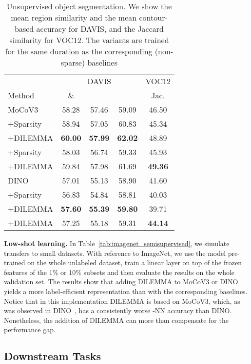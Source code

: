 \documentclass[letterpaper]{article} \usepackage{aaai23}  \usepackage{times}  \usepackage{helvet}  \usepackage{courier}  \usepackage[hyphens]{url}  \usepackage{graphicx} \urlstyle{rm} \def\UrlFont{\rm}  \usepackage{natbib}  \usepackage{caption} \frenchspacing  \setlength{\pdfpagewidth}{8.5in}  \setlength{\pdfpageheight}{11in}  \usepackage{algorithm}
\newcommand{\methodname}{DILEMMA}
\begin{document}
\begin{table}[t]
    \centering
    \small
    \begin{tabular*}{\linewidth}{@{}l@{\extracolsep{\fill}}cccc@{}}
    \toprule
    {} & \multicolumn{3}{c}{DAVIS} & VOC12 \\
    Method & \& &  &  & Jac.\\
    \midrule
    MoCoV3 & 58.28 & 57.46 & 59.09 & 46.50 \\
    +Sparsity & 58.94 & 57.05 & 60.83 & 45.34 \\
    +\methodname & \bf 60.00 & \bf 57.99 & \bf 62.02 & 48.89 \\
    +Sparsity & 58.03 & 56.74 & 59.33 & 45.93 \\
    +\methodname & 59.84 & 57.98 & 61.69 & \bf 49.36 \\
    \midrule
    DINO & 57.01 & 55.13 & 58.90 & 41.60 \\
    +Sparsity & 56.83 & 54.84 & 58.81 & 40.03 \\
    +\methodname & \bf 57.60 & \bf 55.39 & \bf 59.80 & 39.71 \\
    +\methodname & 57.25 & 55.18 & 59.31 & \bf 44.14 \\
    \bottomrule
    \end{tabular*}
    \caption{Unsupervised object segmentation. We show the mean region similarity  and the mean contour-based accuracy  for DAVIS, and the Jaccard similarity for VOC12. The  variants are trained for the same duration as the corresponding (non-sparse) baselines}
    \label{tab:video}
\end{table}

\noindent\textbf{Low-shot learning.}
In Table~\ref{tab:imagenet_semisupervised}, we simulate transfers to small datasets. With reference to ImageNet, we use the model pre-trained on the whole unlabeled dataset, train a linear layer on top of the frozen features of the 1\% or 10\% subsets \cite{chen2020simple} and then evaluate the results on the whole validation set. The results show that adding {\methodname} to MoCoV3 or DINO yields a more label-efficient representation than with the corresponding baselines. Notice that in this implementation {\methodname} is based on MoCoV3, which, as was observed in DINO~\cite{caron2021emerging}, has a consistently worse -NN accuracy than DINO. Nonetheless, the addition of {\methodname} can more than compensate for the performance gap.

\subsection{Downstream Tasks}
\end{document}
